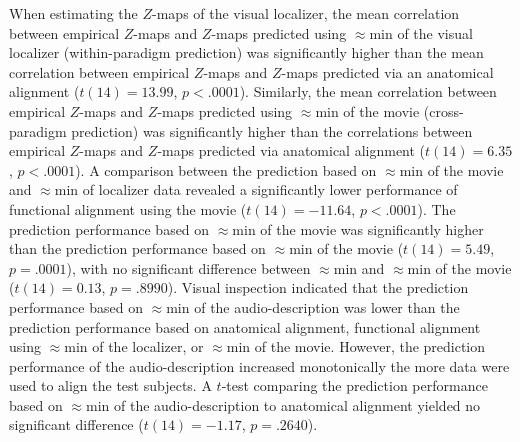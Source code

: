 When estimating the $Z$-maps of the visual localizer, the mean correlation
between empirical $Z$-maps and $Z$-maps predicted using $\approx$\unit[15]{min}
of the visual localizer (within-paradigm prediction) was significantly higher
than the mean correlation between empirical $Z$-maps and $Z$-maps predicted via
an anatomical alignment ($t(14)={13.99}$, $p<.0001$).
Similarly, the mean correlation between empirical $Z$-maps and $Z$-maps
predicted using $\approx$\unit[15]{min} of the movie (cross-paradigm prediction)
was significantly higher than the correlations between empirical $Z$-maps and
$Z$-maps predicted via anatomical alignment ($t(14)=6.35$, $p<.0001$).
%
A comparison between the prediction based on $\approx$\unit[15]{min} of the
movie and $\approx$\unit[15]{min} of localizer data revealed a significantly
lower performance of functional alignment using the movie ($t(14)=-11.64$,
$p<.0001$).
%
The prediction performance based on $\approx$\unit[30]{min} of the movie was
significantly higher than the prediction performance based on
$\approx$\unit[15]{min} of the movie ($t(14)=5.49$, $p=.0001$), with no
significant difference between $\approx$\unit[45]{min} and
$\approx$\unit[30]{min} of the movie ($t(14)=0.13$, $p=.8990$).
Visual inspection indicated that the prediction performance based on
$\approx$\unit[15]{min} of the audio-description was lower than the prediction
performance based on anatomical alignment, functional alignment using
$\approx$\unit[15]{min} of the localizer, or $\approx$\unit[15]{min} of the
movie.
%
However, the prediction performance of the audio-description increased
monotonically the more data were used to align the test subjects.
%
A $t$-test comparing the prediction performance based on
$\approx$\unit[120]{min} of the audio-description to anatomical alignment
yielded no significant difference ($t(14)=-1.17$, $p=.2640$).

